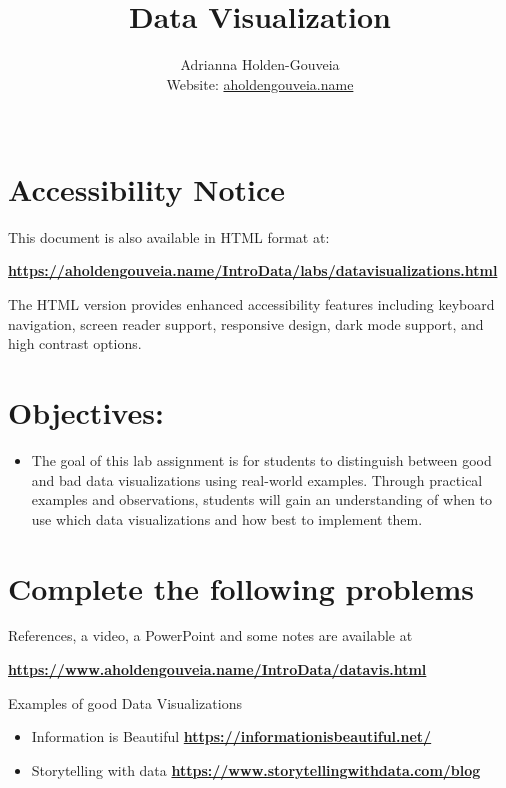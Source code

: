 \documentclass[12pt]{article}
\title{Data Visualization}
\author{
        Adrianna Holden-Gouveia \\
        Website: \href{https://aholdengouveia.name}{aholdengouveia.name}\\
        \faGithub {: aholdengouveia} \\
        }
\date{\vspace{-5ex}}
\begin{document}
    

\maketitle



\section*{Accessibility Notice}
This document is also available in HTML format at:

\href{https://aholdengouveia.name/IntroData/labs/datavisualizations.html}
{\textbf{https://aholdengouveia.name/IntroData/labs/datavisualizations.html}}

The HTML version provides enhanced accessibility features including keyboard navigation, screen reader support, responsive design, dark mode support, and high contrast options.

\section*{Objectives:}
\begin{itemize}
    \item The goal of this lab assignment is for students to distinguish between good and bad data visualizations using real-world examples. Through practical examples and observations, students will gain an understanding of when to use which data visualizations and how best to implement them.
\end{itemize}
\section*{Complete the following problems}

References, a video, a PowerPoint and some notes are available at

\href{https://www.aholdengouveia.name/IntroData/datavis.html}
{\textbf{https://www.aholdengouveia.name/IntroData/datavis.html}}

Examples of good Data Visualizations
\begin{itemize}
    \item Information is Beautiful \href{https://informationisbeautiful.net/}{\textbf{https://informationisbeautiful.net/}}
    \item Storytelling with data \href{https://www.storytellingwithdata.com/blog}{\textbf{https://www.storytellingwithdata.com/blog}}
\end{itemize}    
\end{document}
